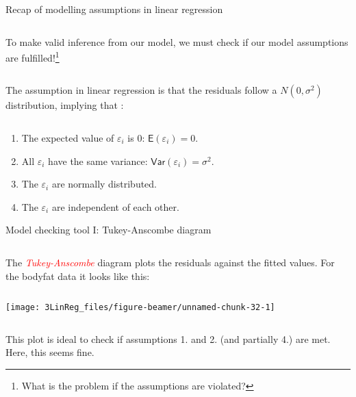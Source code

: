 \documentclass[10pt,ignorenonframetext,]{beamer}
\begin{document}
\begin{frame}

\begin{block}{Recap of modelling assumptions in linear regression}

\(~\)

To make valid inference from our model, we must check if our model
assumptions are
fulfilled!\footnote{What is the problem if the assumptions are violated?}

\(~\)

The assumption in linear regression is that the residuals follow a
\(N(0,\sigma^2)\) distribution, implying that :

\(~\)

\begin{enumerate}
\item
  The expected value of \(\varepsilon_i\) is 0:
  \(\mathsf{E}(\varepsilon_i)=0\). \vspace{1mm}
\item
  All \(\varepsilon_i\) have the same variance:
  \(\mathsf{Var}(\varepsilon_i)=\sigma^2\).\\
  \vspace{1mm}
\item
  The \(\varepsilon_i\) are normally distributed. \vspace{1mm}
\item
  The \(\varepsilon_i\) are independent of each other.
\end{enumerate}

\end{block}

\end{frame}

\begin{frame}

\begin{block}{Model checking tool I: Tukey-Anscombe diagram}

\(~\)

The \emph{\textcolor{red}{Tukey-Anscombe}} diagram plots the residuals
against the fitted values. For the bodyfat data it looks like this:

\(~\)

\begin{center}\texttt{[image: 3LinReg\_files/figure-beamer/unnamed-chunk-32-1]} \end{center}

\(~\)

This plot is ideal to check if assumptions 1. and 2. (and partially 4.)
are met. Here, this seems fine.

\end{block}

\end{frame}
\end{document}
